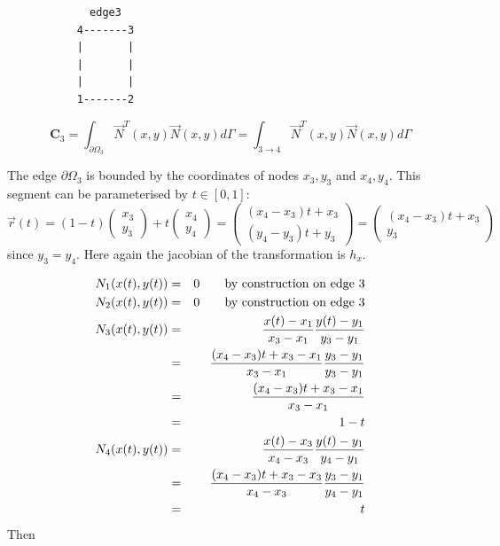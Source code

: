 \begin{verbatim}
             edge3 
           4-------3
           |       |
           |       |
           |       |
           1-------2
\end{verbatim}

\[
{\bm C}_3
=\int_{\partial\Omega_3} \vec{N}^T(x,y) \vec{N}(x,y) d\Gamma
=\int_{3\rightarrow 4} \vec{N}^T(x,y) \vec{N}(x,y) d\Gamma
\]

The edge $\partial\Omega_3$ is bounded by the coordinates of nodes $x_3,y_3$
and $x_4,y_4$. This segment can be parameterised by $t\in[0,1]$:
\[
\vec{r}(t) = (1-t)\left(\begin{array}{c} x_3 \\ y_3 \end{array} \right) + 
t \left(\begin{array}{c} x_4 \\ y_4 \end{array} \right)
= \left(\begin{array}{c} (x_4-x_3)t +x_3 \\ (y_4-y_3)t+y_3 \end{array} \right) 
= \left(\begin{array}{c} (x_4-x_3)t +x_3 \\ y_3 \end{array} \right) 
\]
since $y_3=y_4$.
Here again the jacobian of the transformation is $h_x$.

\begin{eqnarray}
N_1(x(t),y(t)) &=&  0  \qquad \text{by construction on edge 3} \nonumber\\
N_2(x(t),y(t)) &=&  0  \qquad \text{by construction on edge 3} \nonumber\\ 
N_3(x(t),y(t)) 
&=& \frac{x(t)-x_1}{x_3-x_1} \frac{y(t)-y_1}{y_3-y_1} \nonumber\\ 
&=& \frac{(x_4-x_3)t +x_3  -x_1}{x_3-x_1} \frac{y_3-y_1}{y_3-y_1} \nonumber\\ 
&=& \frac{(x_4-x_3)t +x_3  -x_1}{x_3-x_1}  \nonumber\\ 
&=& 1-t \nonumber\\
N_4(x(t),y(t)) 
&=& \frac{x(t)-x_3}{x_4-x_3} \frac{y(t)-y_1}{y_4-y_1} \nonumber\\ 
&=& \frac{(x_4-x_3)t +x_3  -x_3}{x_4-x_3} \frac{y_3-y_1}{y_4-y_1} \nonumber\\ 
&=& t 
\end{eqnarray}
Then 

